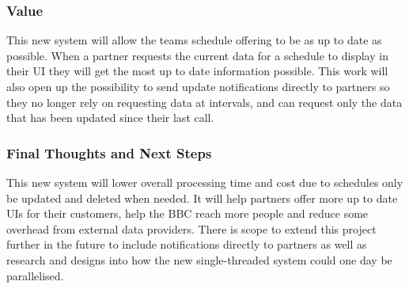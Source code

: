 \subsubsection*{Value}
This new system will allow the teams schedule offering to be as up to date as possible. When a partner requests the current data for a schedule to display in 
their UI they will get the most up to date information possible. This work will also open up the possibility to send update notifications directly to partners
so they no longer rely on requesting data at intervals, and can request only the data that has been updated since their last call.

\subsubsection*{Final Thoughts and Next Steps}
This new system will lower overall processing time and cost due to schedules only be updated and deleted when needed. It will help partners offer more up to 
date UIs for their customers, help the BBC reach more people and reduce some overhead from external data providers. There is scope to extend this project 
further in the future to include notifications directly to partners as well as research and designs into how the new single-threaded system could one day 
be parallelised.

\newpage
